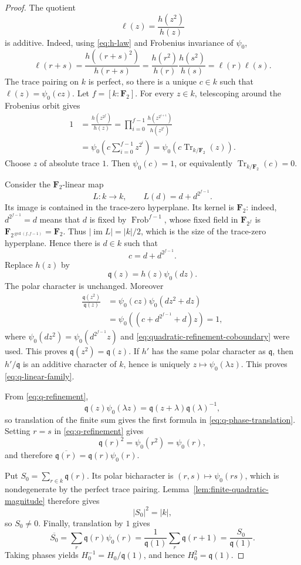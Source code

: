 \documentclass[11pt]{amsart}
\theoremstyle{definition}
\theoremstyle{remark}
\newcommand{\F}{\mathbf F}
\newcommand{\Tr}{\operatorname{Tr}}
\begin{document}
\begin{proof}
The quotient
\[
 \ell(z)=\frac{h(z^2)}{h(z)}
\]
is additive.  Indeed, using \eqref{eq:h-law} and Frobenius invariance
of $\psi_0$,
\[
 \ell(r+s)
 =\frac{h((r+s)^2)}{h(r+s)}
 =\frac{h(r^2)}{h(r)}\frac{h(s^2)}{h(s)}
 =\ell(r)\ell(s).
\]
The trace pairing on $k$ is perfect, so there is a unique $c\in k$
such that $\ell(z)=\psi_0(cz)$.  Let $f=[k:\F_2]$.  For every
$z\in k$, telescoping around the Frobenius orbit gives
\begin{align*}
 1
 &=\frac{h(z^{2^f})}{h(z)}
   =\prod_{i=0}^{f-1}\frac{h(z^{2^{i+1}})}{h(z^{2^i})}\\
 &=\psi_0\!\left(c\sum_{i=0}^{f-1}z^{2^i}\right)
   =\psi_0\!\left(c\Tr_{k/\F_2}(z)\right).
\end{align*}
Choose $z$ of absolute trace $1$.  Then $\psi_0(c)=1$, or equivalently
$\Tr_{k/\F_2}(c)=0$.

Consider the $\F_2$-linear map
\[
 L:k\longrightarrow k,
 \qquad L(d)=d+d^{2^{f-1}}.
\]
Its image is contained in the trace-zero hyperplane.  Its kernel is
$\F_2$: indeed, $d^{2^{f-1}}=d$ means that $d$ is fixed by
$\operatorname{Frob}^{f-1}$, whose fixed field in $\F_{2^f}$ is
$\F_{2^{\gcd(f,f-1)}}=\F_2$.  Thus $|\operatorname{im}L|=|k|/2$,
which is the size of the trace-zero hyperplane.  Hence there is
$d\in k$ such that
\begin{equation}\label{eq:quadratic-refinement-coboundary}
 c=d+d^{2^{f-1}}.
\end{equation}
Replace $h(z)$ by
\[
 \mathfrak q(z)=h(z)\psi_0(dz).
\]
The polar character is unchanged.  Moreover
\begin{align*}
 \frac{\mathfrak q(z^2)}{\mathfrak q(z)}
 &=\psi_0(cz)\psi_0(dz^2+dz)\\
 &=\psi_0\!\left((c+d^{2^{f-1}}+d)z\right)=1,
\end{align*}
where
$\psi_0(dz^2)=\psi_0(d^{2^{f-1}}z)$ and
\eqref{eq:quadratic-refinement-coboundary} were used.  This proves
$\mathfrak q(z^2)=\mathfrak q(z)$.  If $h'$ has the same polar
character as $\mathfrak q$, then $h'/\mathfrak q$ is an additive
character of $k$, hence is uniquely $z\mapsto\psi_0(\lambda z)$.
This proves \eqref{eq:q-linear-family}.

From \eqref{eq:q-refinement},
\[
 \mathfrak q(z)\psi_0(\lambda z)
 =\mathfrak q(z+\lambda)\mathfrak q(\lambda)^{-1},
\]
so translation of the finite sum gives the first formula in
\eqref{eq:q-phase-translation}.  Setting $r=s$ in
\eqref{eq:q-refinement} gives
\[
 \mathfrak q(r)^2=\psi_0(r^2)=\psi_0(r),
\]
and therefore
$\overline{\mathfrak q(r)}=\mathfrak q(r)\psi_0(r)$.

Put $S_0=\sum_{r\in k}\mathfrak q(r)$.  Its polar bicharacter is
$(r,s)\mapsto\psi_0(rs)$, which is nondegenerate by the perfect trace
pairing.  Lemma~\ref{lem:finite-quadratic-magnitude} therefore gives
\[
 |S_0|^2=|k|,
\]
so $S_0\ne0$.  Finally, translation by $1$ gives
\[
 \overline{S_0}
 =\sum_r\mathfrak q(r)\psi_0(r)
 =\frac1{\mathfrak q(1)}\sum_r\mathfrak q(r+1)
 =\frac{S_0}{\mathfrak q(1)}.
\]
Taking phases yields
$H_0^{-1}=H_0/\mathfrak q(1)$, and hence
$H_0^2=\mathfrak q(1)$.
\end{proof}
\end{document}
